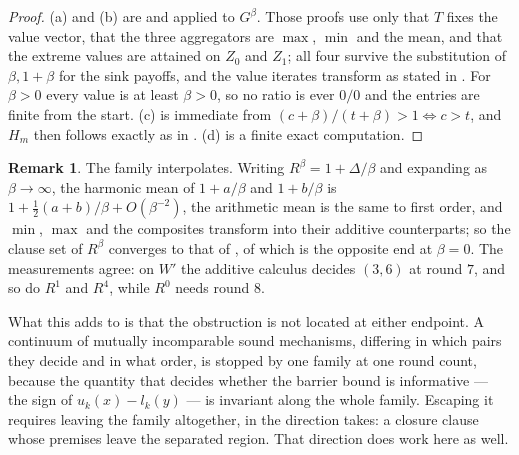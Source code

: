 \documentclass[11pt]{article}
\theoremstyle{plain}
\theoremstyle{definition}
\newtheorem{remark}[theorem]{Remark}
\begin{document}
\begin{proof}
(a) and (b) are  and 
applied to $G^{\beta}$. Those proofs use only that $T$ fixes the value
vector, that the three aggregators are $\max$, $\min$ and the mean, and
that the extreme values are attained on $Z_0$ and $Z_1$; all four survive
the substitution of $\beta,1+\beta$ for the sink payoffs, and the value
iterates transform as stated in . For $\beta>0$ every
value is at least $\beta>0$, so no ratio is ever $0/0$ and the entries
are finite from the start. (c) is immediate from
$(c+\beta)/(t+\beta)>1\iff c>t$, and $H_m$ then follows exactly as in
. (d) is a finite exact computation.
\end{proof}

\begin{remark}\label{rem:mobius}
The family interpolates. Writing $R^{\beta}=1+\Delta/\beta$ and expanding
as $\beta\to\infty$, the harmonic mean of $1+a/\beta$ and $1+b/\beta$ is
$1+\tfrac12(a+b)/\beta+O(\beta^{-2})$, the arithmetic mean is the same to
first order, and $\min$, $\max$ and the composites transform into their
additive counterparts; so the clause set of $R^{\beta}$ converges to that
of , of which  is the opposite end at
$\beta=0$. The measurements agree: on $W'$ the additive calculus decides
$(3,6)$ at round $7$, and so do $R^{1}$ and $R^{4}$, while $R^{0}$ needs
round $8$.

What this adds to  is that the obstruction is not located
at either endpoint. A continuum of mutually incomparable sound
mechanisms, differing in which pairs they decide and in what order, is
stopped by one family at one round count, because the quantity that
decides whether the barrier bound is informative --- the sign of
$u_k(x)-l_k(y)$ --- is invariant along the whole family. Escaping it
requires leaving the family altogether, in the direction
 takes: a closure clause whose premises leave the
separated region. That direction does work here as well.


\end{remark}
\end{document}

